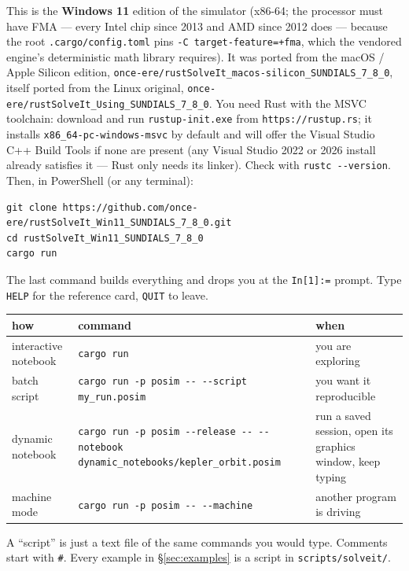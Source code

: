 \documentclass[11pt]{article}
\newcommand{\kw}[1]{\texttt{\uppercase{#1}}}
\newcommand{\code}[1]{\texttt{#1}}
\begin{document}
This is the \textbf{Windows 11} edition of the simulator (x86-64; the
processor must have FMA --- every Intel chip since 2013 and AMD since
2012 does --- because the root \code{.cargo/config.toml} pins
\code{-C target-feature=+fma}, which the vendored engine's deterministic
math library requires). It was ported from the macOS / Apple Silicon
edition, \code{once-ere/rustSolveIt\_macos-silicon\_SUNDIALS\_7\_8\_0},
itself ported from the Linux original,
\code{once-ere/rustSolveIt\_Using\_SUNDIALS\_7\_8\_0}. You need Rust with
the MSVC toolchain: download and run \code{rustup-init.exe} from
\code{https://rustup.rs}; it installs \code{x86\_64-pc-windows-msvc} by
default and will offer the Visual Studio C++ Build Tools if none are
present (any Visual Studio 2022 or 2026 install already satisfies it ---
Rust only needs its linker). Check with \code{rustc -{}-version}. Then,
in PowerShell (or any terminal):

\begin{lstlisting}
git clone https://github.com/once-ere/rustSolveIt_Win11_SUNDIALS_7_8_0.git
cd rustSolveIt_Win11_SUNDIALS_7_8_0
cargo run
\end{lstlisting}

The last command builds everything and drops you at the \code{In[1]:=}
prompt. Type \kw{help} for the reference card, \kw{quit} to leave.

\begin{center}
\begin{tabular}{p{3.4cm}p{7.4cm}p{3.6cm}}
\textbf{how} & \textbf{command} & \textbf{when}\\\hline
interactive notebook & \code{cargo run} & you are exploring\\
batch script & \code{cargo run -p posim -{}- -{}-script my\_run.posim} &
you want it reproducible\\
dynamic notebook & \code{cargo run -p posim -{}-release -{}- -{}-notebook
dynamic\_notebooks/kepler\_orbit.posim} & run a saved session, open its
graphics window, keep typing\\
machine mode & \code{cargo run -p posim -{}- -{}-machine} & another
program is driving\\
\end{tabular}
\end{center}

A ``script'' is just a text file of the same commands you would type.
Comments start with \code{\#}. Every example in \S\ref{sec:examples} is a
script in \code{scripts/solveit/}.
\end{document}
